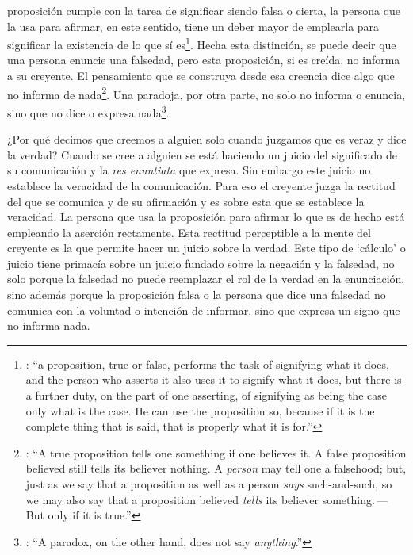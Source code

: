 proposición cumple con la tarea de significar siendo falsa o cierta, la persona que la usa para afirmar, en este sentido, tiene un deber mayor de emplearla para significar la existencia de lo que sí es\footnote{\cite[Cf.~][267]{anscombe2015logic:tsa}: \enquote{a proposition, true or false, performs the task of signifying what it does, and the person who asserts it also uses it to signify what it does, but there is a further duty, on the part of one asserting, of signifying as being the case only what is the case. He can use the proposition so, because if it is the complete thing that is said, that is properly what it is for.}}. Hecha esta distinción, se puede decir que una persona enuncie una falsedad, pero esta proposición, si es creída, no informa a su creyente. El pensamiento que se construya desde esa creencia dice algo que no informa de nada\footnote{\cite[Cf.~][271]{anscombe2015logic:tsa}: \enquote{A true proposition tells one something if one believes it. A false proposition believed still tells its believer nothing. A \emph{person} may tell one a falsehood; but, just as we say that a proposition as well as a person \emph{says} such-and-such, so we may also say that a proposition believed \emph{tells} its believer something.\,---\,But only if it is true.}}. Una paradoja, por otra parte, no solo no informa o enuncia, sino que no dice o expresa nada\footnote{\cite[Cf.~][271]{anscombe2015logic:tsa}: \enquote{A paradox, on the other hand, does not say \emph{anything}.}}.

¿Por qué decimos que creemos a alguien solo cuando juzgamos que es veraz y dice la verdad? Cuando se cree a alguien se está haciendo un juicio del significado de su comunicación y la \emph{res enuntiata} que expresa. Sin embargo este juicio no establece la veracidad de la comunicación. Para eso el creyente juzga la rectitud del que se comunica y de su afirmación y es sobre esta que se establece la veracidad. La persona que usa la proposición para afirmar lo que es de hecho está empleando la aserción rectamente. Esta rectitud perceptible a la mente del creyente es la que permite hacer un juicio sobre la verdad. Este tipo de `cálculo' o juicio tiene primacía sobre un juicio fundado sobre la negación y la falsedad, no solo porque la falsedad no puede reemplazar el rol de la verdad en la enunciación, sino además porque la proposición falsa o la persona que dice una falsedad no comunica con la voluntad o intención de informar, sino que expresa un signo que no informa nada.

